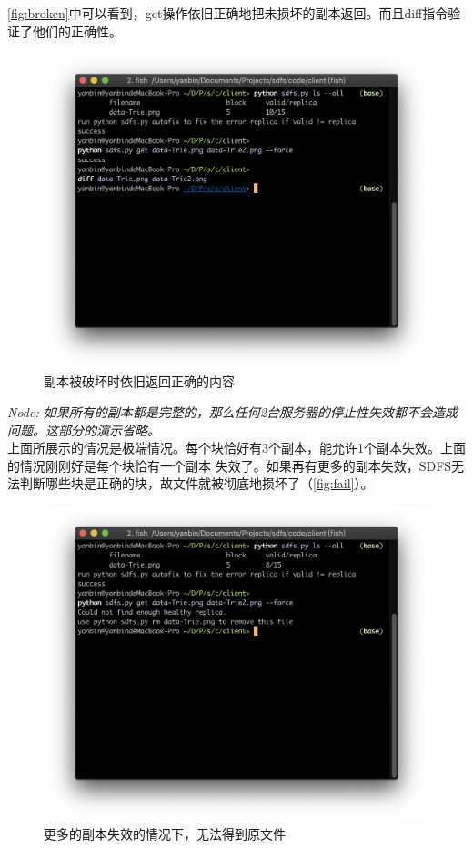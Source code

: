 \documentclass[a4paper]{article}
\begin{document}
\autoref{fig:broken}中可以看到，get操作依旧正确地把未损坏的副本返回。而且diff指令验证了他们的正确性。
\begin{figure}[!hbt]
    \begin{center}
    \includegraphics[scale=0.6]{assets/broken.png}
    \caption{副本被破坏时依旧返回正确的内容\label{fig:broken}} 
    \end{center} 
\end{figure} 

\emph{Node: 如果所有的副本都是完整的，那么任何2台服务器的停止性失效都不会造成问题。这部分的演示省略。}\\

上面所展示的情况是极端情况。每个块恰好有3个副本，能允许1个副本失效。上面的情况刚刚好是每个块恰有一个副本
失效了。如果再有更多的副本失效，SDFS无法判断哪些块是正确的块，故文件就被彻底地损坏了（\autoref{fig:fail}）。\\

\begin{figure}[!hbt]
    \begin{center}
    \includegraphics[scale=0.6]{assets/fail.png}
    \caption{更多的副本失效的情况下，无法得到原文件\label{fig:fail}} 
    \end{center} 
\end{figure} 
\end{document}
